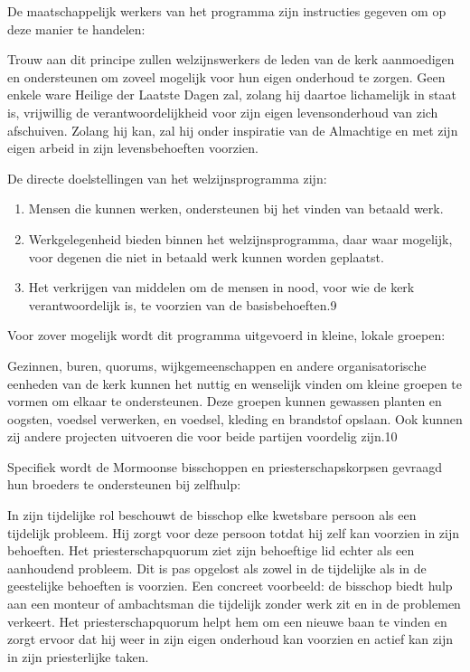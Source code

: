 \documentclass[
  a5paper,
  smalldemyvopaper,10pt,twoside,onecolumn,openright,extrafontsizes,hidelinks]{memoir}
\renewenvironment{quote}%
               {\list{}{\rightmargin=.6cm\leftmargin=.6cm}%
                \itshape \item[]}%
               {\endlist}
\begin{document}
De maatschappelijk werkers van het programma zijn instructies gegeven om
op deze manier te handelen:

\begin{quote}
Trouw aan dit principe zullen welzijnswerkers de leden van de kerk
aanmoedigen en ondersteunen om zoveel mogelijk voor hun eigen onderhoud
te zorgen. Geen enkele ware Heilige der Laatste Dagen zal, zolang hij
daartoe lichamelijk in staat is, vrijwillig de verantwoordelijkheid voor
zijn eigen levensonderhoud van zich afschuiven. Zolang hij kan, zal hij
onder inspiratie van de Almachtige en met zijn eigen arbeid in zijn
levensbehoeften voorzien.
\end{quote}

De directe doelstellingen van het welzijnsprogramma zijn:

\begin{quote}
\begin{enumerate}
\def\labelenumi{\arabic{enumi}.}
\item
  Mensen die kunnen werken, ondersteunen bij het vinden van betaald
  werk.
\item
  Werkgelegenheid bieden binnen het welzijnsprogramma, daar waar
  mogelijk, voor degenen die niet in betaald werk kunnen worden
  geplaatst.
\item
  Het verkrijgen van middelen om de mensen in nood, voor wie de kerk
  verantwoordelijk is, te voorzien van de basisbehoeften.9
\end{enumerate}
\end{quote}

Voor zover mogelijk wordt dit programma uitgevoerd in kleine, lokale
groepen:

\begin{quote}
Gezinnen, buren, quorums, wijkgemeenschappen en andere organisatorische
eenheden van de kerk kunnen het nuttig en wenselijk vinden om kleine
groepen te vormen om elkaar te ondersteunen. Deze groepen kunnen
gewassen planten en oogsten, voedsel verwerken, en voedsel, kleding en
brandstof opslaan. Ook kunnen zij andere projecten uitvoeren die voor
beide partijen voordelig zijn.10
\end{quote}

Specifiek wordt de Mormoonse bisschoppen en priesterschapskorpsen
gevraagd hun broeders te ondersteunen bij zelfhulp:

\begin{quote}
In zijn tijdelijke rol beschouwt de bisschop elke kwetsbare persoon als
een tijdelijk probleem. Hij zorgt voor deze persoon totdat hij zelf kan
voorzien in zijn behoeften. Het priesterschapquorum ziet zijn behoeftige
lid echter als een aanhoudend probleem. Dit is pas opgelost als zowel in
de tijdelijke als in de geestelijke behoeften is voorzien. Een concreet
voorbeeld: de bisschop biedt hulp aan een monteur of ambachtsman die
tijdelijk zonder werk zit en in de problemen verkeert. Het
priesterschapquorum helpt hem om een nieuwe baan te vinden en zorgt
ervoor dat hij weer in zijn eigen onderhoud kan voorzien en actief kan
zijn in zijn priesterlijke taken.
\end{quote}
\end{document}
